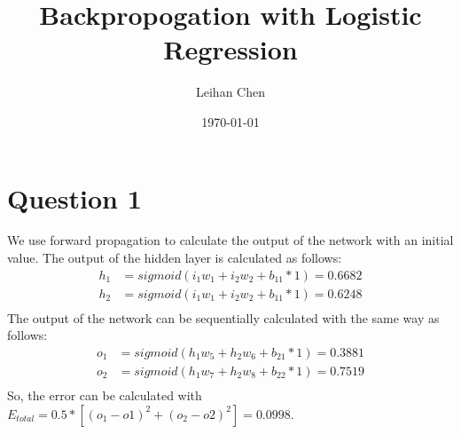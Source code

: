 \documentclass[12pt,a4paper]{article}
\title{Backpropogation with Logistic Regression}
\author{Leihan Chen}
\date{\today}
\begin{document}
\maketitle
\section{Question 1}
We use forward propagation to calculate the output of the network with an initial value. The output of the hidden layer is calculated as follows:
\begin{align*}
    h_1 &= sigmoid(i_1w_1 + i_2w_2 + b_{11} * 1) = 0.6682 \\
    h_2 &= sigmoid(i_1w_1 + i_2w_2 + b_{11} * 1) = 0.6248 \\
\end{align*}
The output of the network can be sequentially calculated with the same way as follows:
\begin{align*}
    o_1 &= sigmoid(h_1w_5 + h_2w_6 + b_{21} * 1) = 0.3881 \\
    o_2 &= sigmoid(h_1w_7 + h_2w_8 + b_{22} * 1) = 0.7519 \\
\end{align*}
So, the error can be calculated with $E_{total} = 0.5 * [{(o_1 - o1)}^2 + {(o_2 - o2)}^2] = 0.0998$.
\end{document}
